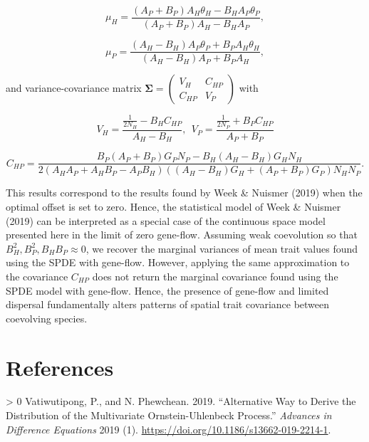\documentclass{article}
\newlength{\cslhangindent}
\newenvironment{CSLReferences}[3] %
 {%
  \setlength{\parindent}{0pt}
  \ifodd #1 \everypar{\setlength{\hangindent}{\cslhangindent}}\ignorespaces\fi
  \ifnum #2 > 0
  \setlength{\parskip}{#2\baselineskip}
  \fi
 }%
 {}
\begin{document}
\[\mu_H=\frac{(A_P+B_P)A_H\theta_H-B_HA_P\theta_P}{(A_P+B_P)A_H-B_HA_P},\]

\[\mu_P=\frac{(A_H-B_H)A_P\theta_P+B_PA_H\theta_H}{(A_H-B_H)A_P+B_PA_H},\]

and variance-covariance matrix
\(\pmb\Sigma=\left(\begin{smallmatrix}V_H & C_{HP} \\ C_{HP} & V_P\end{smallmatrix}\right)\)
with

\[V_H=\frac{\frac{1}{2N_H}-B_HC_{HP}}{A_H-B_H}, \ \ V_P=\frac{\frac{1}{2N_P}+B_PC_{HP}}{A_P+B_P}\]

\[C_{HP}=\frac{B_P(A_P+B_P)G_PN_P-B_H(A_H-B_H)G_HN_H}{2(A_HA_P+A_HB_P-A_PB_H)((A_H-B_H)G_H+(A_P+B_P)G_P)N_HN_P}.\]

This results correspond to the results found by Week \& Nuismer (2019)
when the optimal offset is set to zero. Hence, the statistical model of
Week \& Nuismer (2019) can be interpreted as a special case of the
continuous space model presented here in the limit of zero gene-flow.
Assuming weak coevolution so that \(B_H^2,B_P^2,B_HB_P\approx0\), we
recover the marginal variances of mean trait values found using the SPDE
with gene-flow. However, applying the same approximation to the
covariance \(C_{HP}\) does not return the marginal covariance found
using the SPDE model with gene-flow. Hence, the presence of gene-flow
and limited dispersal fundamentally alters patterns of spatial trait
covariance between coevolving species.

\newpage

\hypertarget{references}{%
\section*{References}\label{references}}

\hypertarget{refs}{}
\begin{CSLReferences}{1}{0}
\leavevmode\hypertarget{ref-Vatiwutipong2019}{}%
Vatiwutipong, P., and N. Phewchean. 2019. {``Alternative Way to Derive
the Distribution of the Multivariate Ornstein-Uhlenbeck Process.''}
\emph{Advances in Difference Equations} 2019 (1).
\url{https://doi.org/10.1186/s13662-019-2214-1}.

\end{CSLReferences}



\end{document}
